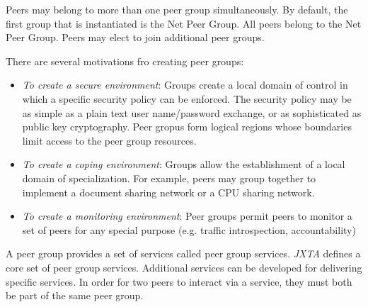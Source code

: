 Peers may belong to more than one peer group simultaneously. By default, the first group that is instantiated is the Net Peer Group. All peers belong to the Net Peer Group. Peers may elect to join additional peer groups.

There are several motivations fro creating peer groups:
\begin{itemize}
 \item \emph{To create a secure environment}: Groups create a local domain of control in which a specific security policy can be enforced. The security policy may be as simple as a plain text user name/password exchange, or as sophisticated as public key cryptography. Peer gropus form logical regions whose boundaries limit access to the peer group resources.
 \item \emph{To create a coping environment}: Groups allow the establishment of a local domain of specialization. For example, peers may group together to implement a document sharing network or a CPU sharing network.
 \item \emph{To create a monitoring environment}: Peer groups permit peers to monitor a set of peers for any special purpose (e.g. traffic introspection, accountability) 
\end{itemize}

A peer group provides a set of services called peer group services. \emph{JXTA} defines a core set of peer group services. Additional services can be developed for delivering specific services. In order for two peers to interact via a service, they must both be part of the same peer group.

